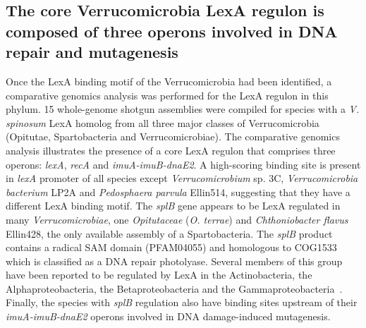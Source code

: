 \subsection{The core Verrucomicrobia LexA regulon is composed of three operons
  involved in DNA repair and mutagenesis}

Once the LexA binding motif of the Verrucomicrobia had been identified, a comparative
genomics analysis was performed for the LexA regulon in this phylum. 15
whole-genome shotgun assemblies were compiled for species with a
\textit{V. spinosum} LexA homolog from all three major classes of
Verrucomicrobia (Opitutae, Spartobacteria and Verrucomicrobiae). The
comparative genomics analysis illustrates the presence of a core LexA regulon
that comprises three operons: \textit{lexA}, \textit{recA} and
\textit{imuA-imuB-dnaE2}. A high-scoring binding site is present in
\textit{lexA} promoter of all species except \textit{Verrucomicrobium} sp. 3C,
\textit{Verrucomicrobia bacterium} LP2A and \textit{Pedosphaera parvula}
Ellin514, suggesting that they have a different LexA binding motif. The
\textit{splB} gene appears to be LexA regulated in many \textit{Verrucomicrobiae},
one \textit{Opitutaceae} (\textit{O. terrae}) and \textit{Chthoniobacter
  flavus} Ellin428, the only available assembly of a Spartobacteria. The
\textit{splB} product contains a radical SAM domain (PFAM04055) and homologous
to COG1533 which is classified as a DNA repair photolyase. Several members of
this group have been reported to be regulated by LexA in the Actinobacteria,
the Alphaproteobacteria, the Betaproteobacteria and the
Gammaproteobacteria~\citep{davis2002definition, cirz2006defining,
  sanchez2012analysis, ulrich2013characterization, sanchez2015sos}. Finally,
the species with \textit{splB} regulation also have binding sites upstream of
their \textit{imuA-imuB-dnaE2} operons involved in DNA damage-induced
mutagenesis.

